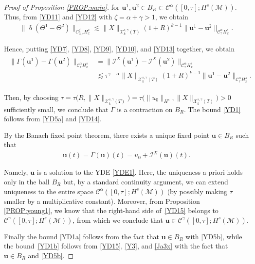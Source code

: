 \documentclass[letterpaper, 11pt,  reqno]{amsart}
\newcommand{\1}{\hspace{0.5mm}\text{I}\hspace{0.5mm}}
\newcommand{\I}{\mathcal{I}}
\newcommand{\noi}{\noindent}
\newcommand{\CC}{\mathcal{C}}
\newcommand{\al}{\alpha}
\newcommand{\updl}{\updelta}
\newcommand{\g}{\gamma}
\newcommand{\G}{\Gamma}
\newcommand{\les}{\lesssim}
\newcommand{\M}{\mathcal{M}}
\newcommand{\cC}{\mathcal{C}}
\newcommand{\cX}{\mathcal{X}}
\newcommand{\uu}{\mathbf{u}}
\newcommand{\z}{\zeta}
\newcommand{\Ta}{\Theta}
\numberwithin{equation}{section}
\numberwithin{theorem}{section}
\begin{document}
\begin{proof}[Proof of Proposition \ref{PROP:main}]
\noi
for 
 $\uu^1, \uu^2 \in B_R\subset \cC^\al([0, \tau]; H^s(\M))$.
Thus, from \eqref{YD11} and \eqref{YD12} with $\z = \al + \g > 1$, we obtain
\begin{align}
\label{YD13}
\| \updl (\Theta^1 - \Ta^2)\|_{C^\z_{3,\tau} H^s_x}
\les 
\|X\|_{\cX^{s, \g}_k(T)}  (1+R)^{k-1}\|\uu^1- \uu^2 \|_{\CC^\al _\tau H^s_x}.
\end{align}






Hence, putting
\eqref{YD7}, \eqref{YD8}, 
\eqref{YD9}, \eqref{YD10}, and \eqref{YD13}
together, 
we obtain
\begin{align}
\begin{split}
\|\G(\uu^1)- \G(\uu^2)\|_{\cC^\al _{\tau} H^s_x}
& = 
\|\I^X(\uu^1)- \I^X(\uu^2)\|_{\CC^\al_{\tau}H^s_x}\\
&  \les 
\tau^{\g - \al}\|X\|_{\cX^{s, \g}_k(T)}  (1+R)^{k-1}\|\uu^1- \uu^2 \|_{\CC^\al _\tau H^s_x}.
\end{split}
\label{YD14}
\end{align}

\noi
Then, by 
 choosing 
$\tau = 
\tau\big(R, \|X\|_{\cX^{s, \g}_k(T)}\big) 
= 
\tau\big(\|u_0\|_{H^s}, \|X\|_{\cX^{s, \g}_k(T)}\big) >0$
sufficiently small, 
we conclude that $\G$ is a contraction on $B_R$.
The bound \eqref{YD1} follows from \eqref{YD5a} and \eqref{YD14}.


By the Banach fixed point theorem, 
there exists a unique fixed point $\uu \in B_R$
such that 
\begin{align}
\uu (t)= \G(\uu)(t) = u_0 + \I^X(\uu)(t).
\label{YD15}
\end{align}

\noi
Namely, 
$\uu$ is a solution to the YDE \eqref{YDE1}.
Here, the uniqueness a priori holds only in the ball $B_R$
but, by a standard continuity argument, 
we can extend uniqueness to the entire space $\CC^\al([0, \tau]; H^s(\M))$
(by possibly making $\tau$ smaller by a multiplicative constant).
Moreover,  from Proposition \ref{PROP:young1}, 
we know that the right-hand side of~\eqref{YD15}
belongs to $\CC^\g([0, \tau]; H^s(\M))$, 
from which we conclude that $\uu \in \CC^\g([0, \tau]; H^s(\M))$.

Finally the bound \eqref{YD1a}
follows from the fact that $\uu \in B_R$ with \eqref{YD5b}, 
while 
 the bound~\eqref{YD1b}
follows from 
\eqref{YD15}, 
\eqref{Y3}, and  \eqref{Ja3x} 
with the fact that $\uu \in B_R$ and \eqref{YD5b}.


\medskip


\end{proof}
\end{document}
